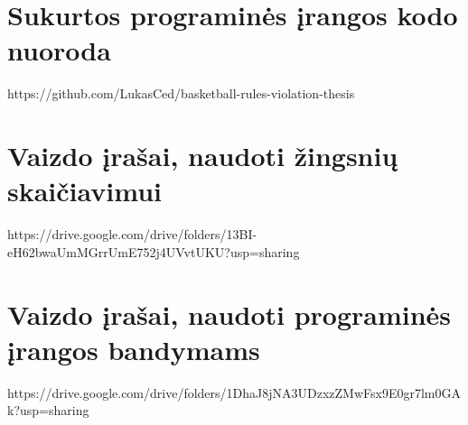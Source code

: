 \documentclass{VUMIFPSbakalaurinis}
\begin{document}
\printbibliography[heading=bibintoc,title=Šaltiniai]  %


\appendix  %

\section{Sukurtos programinės įrangos kodo nuoroda}
https://github.com/LukasCed/basketball-rules-violation-thesis

\section{Vaizdo įrašai, naudoti žingsnių skaičiavimui}
https://drive.google.com/drive/folders/13BI-eH62bwaUmMGrrUmE752j4UVvtUKU?usp=sharing

\section{Vaizdo įrašai, naudoti programinės įrangos bandymams}
https://drive.google.com/drive/folders/1DhaJ8jNA3UDzxzZMwFsx9E0gr7lm0GAk?usp=sharing
\end{document}
